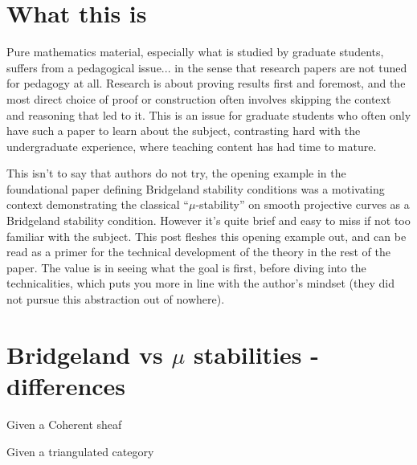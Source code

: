 \documentclass[]{article}
\begin{document}

\maketitle
\tableofcontents

\section{What this is}

Pure mathematics material, especially what is studied by graduate students, suffers from a pedagogical issue...
in the sense that research papers are not tuned for pedagogy at all.
Research is about proving results first and foremost, and the most direct choice of proof or construction often
involves skipping the context and reasoning that led to it.
This is an issue for graduate students who often only have such a paper to learn about the subject,
contrasting hard with the undergraduate experience, where teaching content has had time to mature.

This isn't to say that authors do not try, the opening example in the foundational paper defining Bridgeland
stability conditions \cite{bridgeland2006stabilityconditionstriangulatedcategories} was a motivating context
demonstrating the classical ``$\mu$-stability'' on smooth projective curves as a Bridgeland stability condition.
However it's quite brief and easy to miss if not too familiar with the subject.
This post fleshes this opening example out, and can be read as a primer for the technical development of the
theory in the rest of the paper.
The value is in seeing what the goal is first, before diving into the technicalities,
which puts you more in line with the author's mindset
(they did not pursue this abstraction out of nowhere).

\section{Bridgeland vs $\mu$ stabilities - differences}

\begin{flexbox}
\begin{definition}[$\mu$-stability]
Given a Coherent sheaf
\end{definition}
\begin{definition}
Given a triangulated category
\end{definition}
\end{flexbox}

\printbibliography
\end{document}
